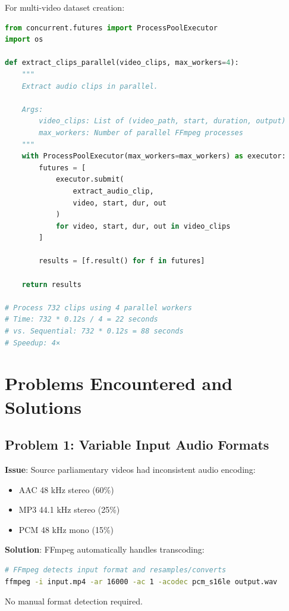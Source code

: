 \documentclass[11pt,a4paper]{article}
\begin{document}
For multi-video dataset creation:

\begin{lstlisting}[language=Python]
from concurrent.futures import ProcessPoolExecutor
import os

def extract_clips_parallel(video_clips, max_workers=4):
    """
    Extract audio clips in parallel.
    
    Args:
        video_clips: List of (video_path, start, duration, output)
        max_workers: Number of parallel FFmpeg processes
    """
    with ProcessPoolExecutor(max_workers=max_workers) as executor:
        futures = [
            executor.submit(
                extract_audio_clip, 
                video, start, dur, out
            )
            for video, start, dur, out in video_clips
        ]
        
        results = [f.result() for f in futures]
    
    return results

# Process 732 clips using 4 parallel workers
# Time: 732 * 0.12s / 4 = 22 seconds
# vs. Sequential: 732 * 0.12s = 88 seconds
# Speedup: 4×
\end{lstlisting}

\section{Problems Encountered and Solutions}

\subsection{Problem 1: Variable Input Audio Formats}

\textbf{Issue}: Source parliamentary videos had inconsistent audio encoding:
\begin{itemize}
    \item AAC 48 kHz stereo (60\%)
    \item MP3 44.1 kHz stereo (25\%)
    \item PCM 48 kHz mono (15\%)
\end{itemize}

\textbf{Solution}: FFmpeg automatically handles transcoding:
\begin{lstlisting}[language=Bash]
# FFmpeg detects input format and resamples/converts
ffmpeg -i input.mp4 -ar 16000 -ac 1 -acodec pcm_s16le output.wav
\end{lstlisting}

No manual format detection required.
\end{document}
